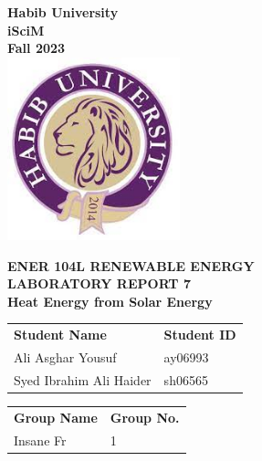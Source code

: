 \documentclass[a4paper, 12pt, english]{article}
\begin{document}
\begin{titlepage}
	\begin{center}
		\textbf{\LARGE Habib University}\\[0.5cm]
		\textbf{\large iSciM}\\[0.2cm]
		\textbf {\large Fall 2023}\\[0.2cm]
		\vspace{20pt}
		\includegraphics[width=5cm]{../habiblogo.jpg}\\[1cm]
		\par
		\vspace{20pt}
		\textbf{\Large ENER 104L RENEWABLE ENERGY}\\
		\vspace{15pt}
		\myrule[1pt][7pt]
		\textbf{\LARGE  LABORATORY REPORT 7}\\
		\vspace{15pt}
		\textbf{\large Heat Energy from Solar Energy}\\
		\myrule[1pt][7pt]
		\vspace{25pt}
		\begin{tabular}{@{}p{5cm}p{3cm}@{}}
			\textbf{\large Student Name} & \textbf{\large Student ID} \\
			Ali Asghar Yousuf            & ay06993                    \\ %
			Syed Ibrahim Ali Haider      & sh06565                    \\ %
		\end{tabular}

		\vspace{10pt}
		\begin{tabular}{@{}p{5cm}p{3cm}@{}}
			\textbf{\large Group Name} & \textbf{\large Group No.} \\
			Insane Fr                  & 1                         \\
		\end{tabular}


\end{center}
\end{titlepage}
\end{document}
